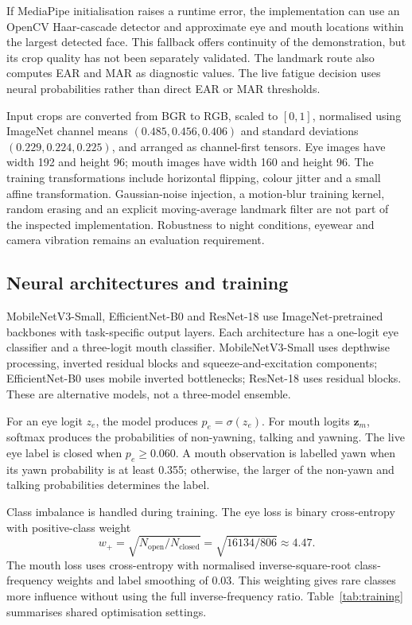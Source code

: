 \documentclass[pdflatex,sn-mathphys-num]{sn-jnl}
\begin{document}
If MediaPipe initialisation raises a runtime error, the implementation can use an OpenCV Haar-cascade detector and approximate eye and mouth locations within the largest detected face. This fallback offers continuity of the demonstration, but its crop quality has not been separately validated. The landmark route also computes EAR and MAR as diagnostic values. The live fatigue decision uses neural probabilities rather than direct EAR or MAR thresholds.

Input crops are converted from BGR to RGB, scaled to $[0,1]$, normalised using ImageNet channel means $(0.485,0.456,0.406)$ and standard deviations $(0.229,0.224,0.225)$, and arranged as channel-first tensors. Eye images have width 192 and height 96; mouth images have width 160 and height 96. The training transformations include horizontal flipping, colour jitter and a small affine transformation. Gaussian-noise injection, a motion-blur training kernel, random erasing and an explicit moving-average landmark filter are not part of the inspected implementation. Robustness to night conditions, eyewear and camera vibration remains an evaluation requirement.

\subsection{Neural architectures and training}
MobileNetV3-Small, EfficientNet-B0 and ResNet-18 use ImageNet-pretrained backbones with task-specific output layers. Each architecture has a one-logit eye classifier and a three-logit mouth classifier. MobileNetV3-Small uses depthwise processing, inverted residual blocks and squeeze-and-excitation components; EfficientNet-B0 uses mobile inverted bottlenecks; ResNet-18 uses residual blocks. These are alternative models, not a three-model ensemble.

For an eye logit $z_e$, the model produces $p_e=\sigma(z_e)$. For mouth logits $\mathbf{z}_m$, softmax produces the probabilities of non-yawning, talking and yawning. The live eye label is closed when $p_e\geq0.060$. A mouth observation is labelled yawn when its yawn probability is at least 0.355; otherwise, the larger of the non-yawn and talking probabilities determines the label.

Class imbalance is handled during training. The eye loss is binary cross-entropy with positive-class weight
\begin{equation}
 w_+=\sqrt{N_{\mathrm{open}}/N_{\mathrm{closed}}}
     =\sqrt{16134/806}\approx4.47.
\end{equation}
The mouth loss uses cross-entropy with normalised inverse-square-root class-frequency weights and label smoothing of 0.03. This weighting gives rare classes more influence without using the full inverse-frequency ratio. Table~\ref{tab:training} summarises shared optimisation settings.
\end{document}
